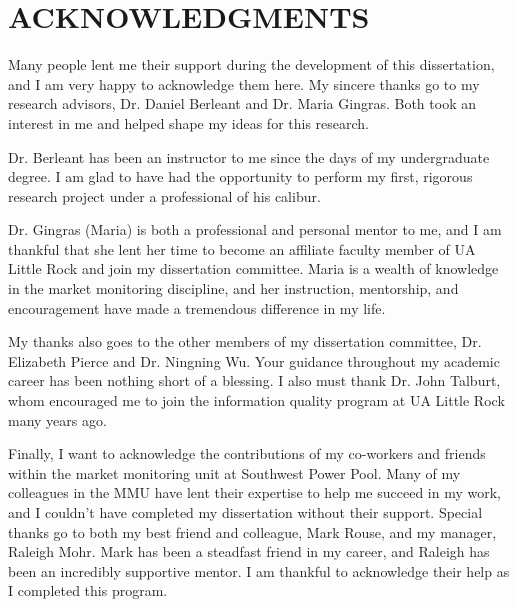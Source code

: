 %
%
%
%  
%


\chapter*{ACKNOWLEDGMENTS}

Many people lent me their support during the development of this dissertation, and I am very happy to acknowledge them here. My sincere thanks go to my research advisors, Dr. Daniel Berleant and Dr. Maria Gingras. Both took an interest in me and helped shape my ideas for this research. 

Dr. Berleant has been an instructor to me since the days of my undergraduate degree. I am glad to have had the opportunity to perform my first, rigorous research project under a professional of his calibur.

Dr. Gingras (Maria) is both a professional and personal mentor to me, and I am thankful that she lent her time to become an affiliate faculty member of UA Little Rock and join my dissertation committee. Maria is a wealth of knowledge in the market monitoring discipline, and her instruction, mentorship, and encouragement have made a tremendous difference in my life.

My thanks also goes to the other members of my dissertation committee, Dr. Elizabeth Pierce and Dr. Ningning Wu. Your guidance throughout my academic career has been nothing short of a blessing. I also must thank Dr. John Talburt, whom encouraged me to join the information quality program at UA Little Rock many years ago. 

Finally, I want to acknowledge the contributions of my co-workers and friends within the market monitoring unit at Southwest Power Pool. Many of my colleagues in the MMU have lent their expertise to help me succeed in my work, and I couldn't have completed my dissertation without their support. Special thanks go to both my best friend and colleague, Mark Rouse, and my manager, Raleigh Mohr. Mark has been a steadfast friend in my career, and Raleigh has been an incredibly supportive mentor. I am thankful to acknowledge their help as I completed this program.

\pagebreak{}